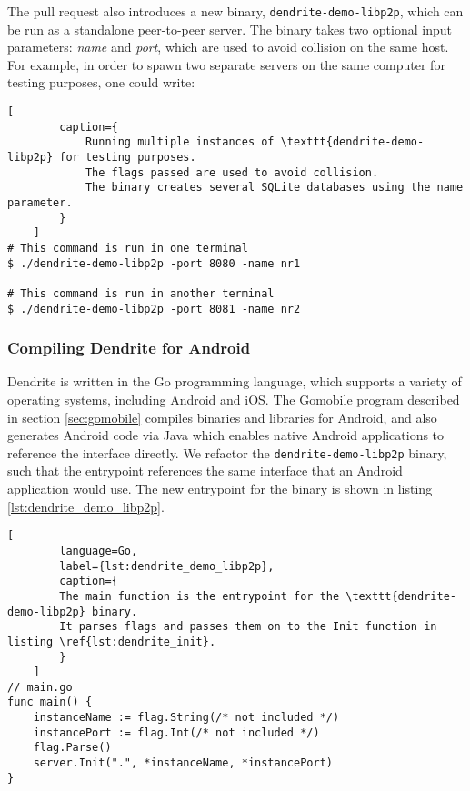 The pull request also introduces a new binary, \texttt{dendrite-demo-libp2p}, which can be run as a standalone peer-to-peer server.
The binary takes two optional input parameters: \textit{name} and \textit{port}, which are used to avoid collision on the same host.
For example, in order to spawn two separate servers on the same computer for testing purposes, one could write:

\begin{lstfloat}
    \begin{lstlisting}[
        caption={
            Running multiple instances of \texttt{dendrite-demo-libp2p} for testing purposes.
            The flags passed are used to avoid collision.
            The binary creates several SQLite databases using the name parameter.
        }
    ]
# This command is run in one terminal
$ ./dendrite-demo-libp2p -port 8080 -name nr1

# This command is run in another terminal
$ ./dendrite-demo-libp2p -port 8081 -name nr2
\end{lstlisting}
\end{lstfloat}



\subsubsection{Compiling Dendrite for Android}
Dendrite is written in the Go programming language, which supports a variety of operating systems, including Android and iOS.
The Gomobile program described in section \ref{sec:gomobile} compiles binaries and libraries for Android, and also generates Android code via Java which enables native Android applications to reference the interface directly.
We refactor the \texttt{dendrite-demo-libp2p} binary, such that the entrypoint references the same interface that an Android application would use.
The new entrypoint for the binary is shown in listing \ref{lst:dendrite_demo_libp2p}.

\begin{lstfloat}
    \begin{lstlisting}[
        language=Go,
        label={lst:dendrite_demo_libp2p},
        caption={
        The main function is the entrypoint for the \texttt{dendrite-demo-libp2p} binary.
        It parses flags and passes them on to the Init function in listing \ref{lst:dendrite_init}.
        }
    ]
// main.go
func main() {
    instanceName := flag.String(/* not included */)
    instancePort := flag.Int(/* not included */)
    flag.Parse()
    server.Init(".", *instanceName, *instancePort)
}
\end{lstlisting}
\end{lstfloat}

